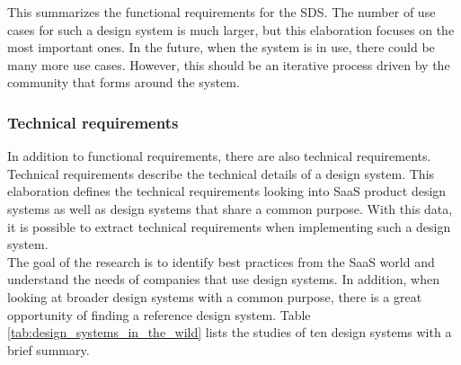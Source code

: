 This summarizes the functional requirements for the SDS. The number of use cases for such a design system is much larger, but this elaboration focuses on the most important ones. In the future, when the system is in use, there could be many more use cases. However, this should be an iterative process driven by the community that forms around the system.

\subsubsection{Technical requirements}
In addition to functional requirements, there are also technical requirements. Technical requirements describe the technical details of a design system. This elaboration defines the technical requirements looking into \ac{SaaS} product design systems as well as design systems that share a common purpose. With this data, it is possible to extract technical requirements when implementing such a design system.\\
The goal of the research is to identify best practices from the \ac{SaaS} world and understand the needs of companies that use design systems. In addition, when looking at broader design systems with a common purpose, there is a great opportunity of finding a reference design system. Table \ref{tab:design_systems_in_the_wild} lists the studies of ten design systems with a brief summary.
